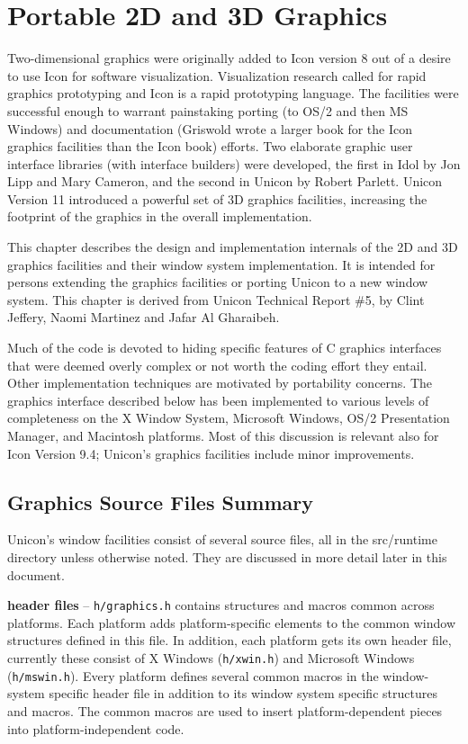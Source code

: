 \chapter{Portable 2D and 3D Graphics}

Two-dimensional graphics were originally added to Icon version 8 out
of a desire to use Icon for software visualization. Visualization
research called for rapid graphics prototyping and Icon is a rapid
prototyping language. The facilities were successful enough to warrant
painstaking porting (to OS/2 and then MS Windows) and documentation
(Griswold wrote a larger book for the Icon graphics facilities than
the Icon book) efforts.  Two elaborate graphic user interface
libraries (with interface builders) were developed, the first in Idol
by Jon Lipp and Mary Cameron, and the second in Unicon by Robert
Parlett.  Unicon Version 11 introduced a powerful set of 3D graphics
facilities, increasing the footprint of the graphics in the overall
implementation.

This chapter describes the design and implementation internals of the
2D and 3D graphics facilities and their window system
implementation. It is intended for persons extending the graphics
facilities or porting Unicon to a new window system. This chapter is
derived from Unicon Technical Report \#5, by Clint Jeffery, Naomi
Martinez and Jafar Al Gharaibeh.

Much of the code is devoted to hiding specific features of C graphics
interfaces that were deemed overly complex or not worth the coding
effort they entail. Other implementation techniques are motivated by
portability concerns. The graphics interface described below has been
implemented to various levels of completeness on the X Window System,
Microsoft Windows, OS/2 Presentation Manager, and Macintosh
platforms. Most of this discussion is relevant also for Icon Version
9.4; Unicon's graphics facilities include minor improvements.

\section{Graphics Source Files Summary}

Unicon's window facilities consist of several source files, all in the
src/runtime directory unless otherwise noted. They are discussed in more
detail later in this document.

\textbf{header files} -- \texttt{h/graphics.h} contains structures and
macros common across platforms. Each platform adds platform-specific
elements to the common window structures defined in this file. In
addition, each platform gets its own header file, currently these
consist of X Windows (\texttt{h/xwin.h}) and Microsoft Windows
(\texttt{h/mswin.h}). Every platform defines several common macros in
the window-system specific header file in addition to its window
system specific structures and macros. The common macros are used to
insert platform-dependent pieces into platform-independent code.

